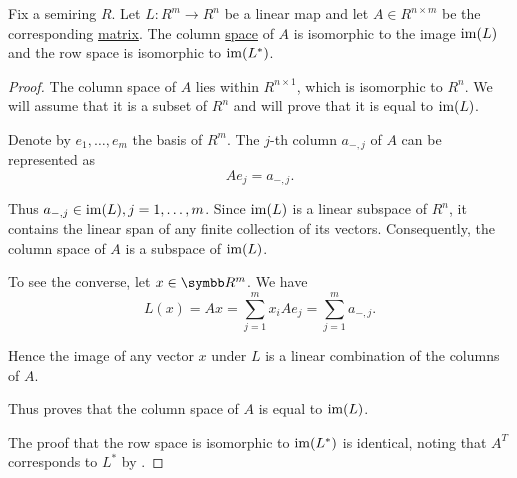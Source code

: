 \begin{proposition}\label{thm:column_and_row_spaces_are_images}
  Fix a semiring \( R \). Let \( L: R^m \to R^n \) be a linear map and let \( A \in R^{n \times m} \) be the corresponding \hyperref[thm:finite_dimensional_operators_are_isomorphic_to_matrices]{matrix}. The column \hyperref[def:matrix_column_and_row_space]{space} of \( A \) is isomorphic to the image \( \operatorname{im}(L) \) and the row space is isomorphic to \( \operatorname{im}(L^*) \).
\end{proposition}
\begin{proof}
  The column space of \( A \) lies within \( R^{n \times 1} \), which is isomorphic to \( R^n \). We will assume that it is a subset of \( R^n \) and will prove that it is equal to \( \operatorname{im}(L) \).

  Denote by \( e_1, \ldots, e_m \) the basis of \( R^m \). The \( j \)-th column \( a_{-,j} \) of \( A \) can be represented as
  \begin{equation*}
    A e_j = a_{-,j}.
  \end{equation*}

  Thus \( a_{-,j} \in \operatorname{im}(L), j = 1, \ldots, m \). Since \( \operatorname{im}(L) \) is a linear subspace of \( R^n \), it contains the linear span of any finite collection of its vectors. Consequently, the column space of \( A \) is a subspace of \( \operatorname{im}(L) \).

  To see the converse, let \( x \in \BR^m \). We have
  \begin{equation*}
    L(x) = Ax = \sum_{j=1}^m x_i A e_j = \sum_{j=1}^m a_{-,j}.
  \end{equation*}

  Hence the image of any vector \( x \) under \( L \) is a linear combination of the columns of \( A \).

  Thus proves that the column space of \( A \) is equal to \( \operatorname{im}(L) \).

  The proof that the row space is isomorphic to \( \operatorname{im}(L^*) \) is identical, noting that \( A^T \) corresponds to \( L^* \) by .
\end{proof}
